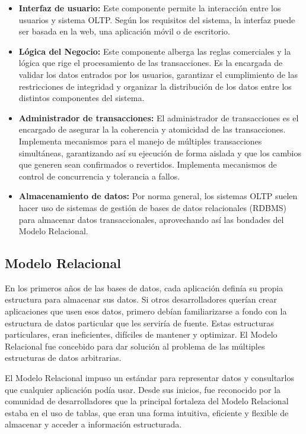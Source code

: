 \begin{itemize}
    \item \textbf{Interfaz de usuario:} Este componente permite la interacci\'on entre los usuarios y sistema OLTP. Seg\'un 
        los requisitos del sistema, la interfaz puede ser basada en la web, una aplicaci\'on m\'ovil o de escritorio.

    \item \textbf{Lógica del Negocio:} Este componente alberga las reglas comerciales y la lógica 
        que rige el procesamiento de las transacciones. Es la encargada de validar los datos entrados por los usuarios, 
        garantizar el cumplimiento de las restricciones de integridad y organizar la distribuci\'on de los datos entre los 
        distintos componentes del sistema.

    \item \textbf{Administrador de transacciones:} El administrador de transacciones es el encargado de asegurar la 
        la coherencia y atomicidad de las transacciones. Implementa mecanismos para el manejo de múltiples transacciones 
        simultáneas, garantizando as\'i su ejecuci\'on de forma aislada y que los cambios que generen sean confirmados o 
        revertidos. Implementa mecanismos de control de concurrencia y tolerancia a fallos.

    \item \textbf{Almacenamiento de datos:} Por norma general, los sistemas OLTP suelen hacer uso de sistemas de gestión
        de bases de datos relacionales (RDBMS) para almacenar datos transaccionales, aprovechando as\'i las bondades del 
        Modelo Relacional.
\end{itemize}

\subsection{Modelo Relacional}

En los primeros años de las bases de datos, cada aplicaci\'on defin\'ia su propia estructura para almacenar sus datos. 
Si otros desarrolladores querían crear aplicaciones que usen esos datos, primero deb\'ian familiarizarse a fondo con 
la estructura de datos particular que les servir\'ia de fuente. Estas estructuras particulares, eran ineficientes, difíciles
de mantener y optimizar. El Modelo Relacional fue concebido para dar soluci\'on al problema de las m\'ultiples estructuras 
de datos arbitrarias.

El Modelo Relacional impuso un estándar para representar datos y consultarlos que cualquier aplicación pod\'ia usar. 
Desde sus inicios, fue reconocido por la comunidad de desarrolladores que la principal fortaleza del Modelo Relacional 
estaba en el uso de tablas, que eran una forma intuitiva, eficiente y flexible de almacenar y acceder a 
información estructurada.

